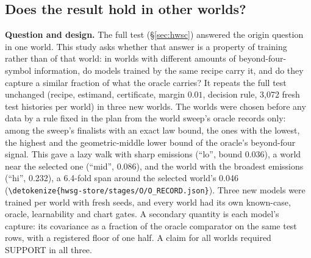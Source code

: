 \documentclass[11pt,a4paper]{article}
\DeclareRobustCommand{\_}{\ifmmode\origunderscore\else\textunderscore\allowbreak\fi}
\DeclareRobustCommand{\fpath}[1]{\begingroup\small\expandafter\nolinkurl\expandafter{\detokenize{#1}}\endgroup}
\begin{document}
\subsection{Does the result hold in other worlds?}\label{sec:hwsg}
\textbf{Question and design.} The full test (\S\ref{sec:hwsc}) answered the origin question in one
world. This study asks whether that answer is a property of training rather than of that world:
in worlds with different amounts of beyond-four-symbol information, do models trained by the same
recipe carry it, and do they capture a similar fraction of what the oracle carries? It repeats the
full test unchanged (recipe, estimand, certificate, margin $0.01$, decision rule, 3,072 fresh test
histories per world) in three new worlds. The worlds were chosen before any data by a rule fixed
in the plan from the world sweep's oracle records only: among the sweep's finalists with an exact
law bound, the ones with the lowest, the highest and the geometric-middle lower bound of the
oracle's beyond-four signal. This gave a lazy walk with sharp emissions (``lo'', bound 0.036), a
world near the selected one (``mid'', 0.086), and the world with the broadest emissions (``hi'',
0.232), a 6.4-fold span around the selected world's 0.046 (\fpath{hwsg-store/stages/O/O_RECORD.json}).
Three new models were trained per world with fresh seeds, and every world had its own
known-case, oracle, learnability and chart gates. A secondary quantity is each model's capture:
its covariance as a fraction of the oracle comparator on the same test rows, with a registered
floor of one half. A claim for all worlds required SUPPORT in all three.
\end{document}
